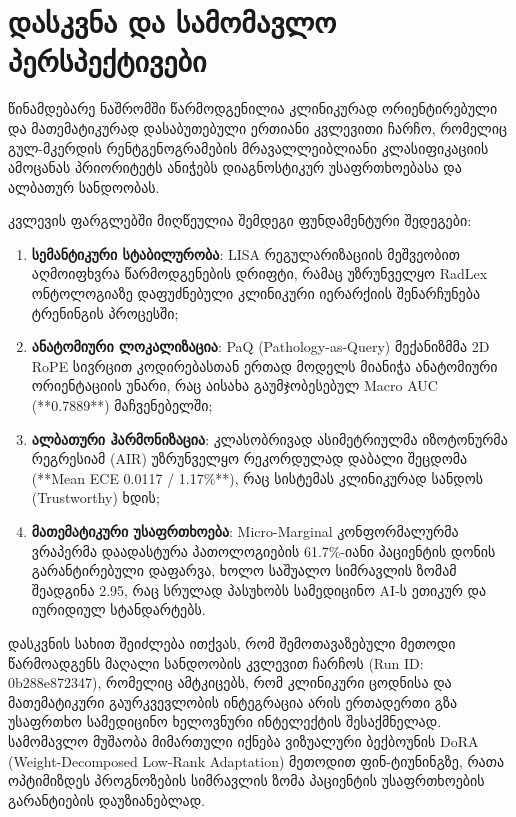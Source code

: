 \documentclass[12pt,a4paper,oneside]{report}
\begin{document}
\chapter{დასკვნა და სამომავლო პერსპექტივები}
წინამდებარე ნაშრომში წარმოდგენილია კლინიკურად ორიენტირებული და მათემატიკურად დასაბუთებული ერთიანი კვლევითი ჩარჩო, რომელიც გულ-მკერდის რენტგენოგრამების მრავალლეიბლიანი კლასიფიკაციის ამოცანას პრიორიტეტს ანიჭებს დიაგნოსტიკურ უსაფრთხოებასა და ალბათურ სანდოობას.

კვლევის ფარგლებში მიღწეულია შემდეგი ფუნდამენტური შედეგები:
\begin{enumerate}[leftmargin=1.6em]
    \item \textbf{სემანტიკური სტაბილურობა}: LISA რეგულარიზაციის მეშვეობით აღმოიფხვრა წარმოდგენების დრიფტი, რამაც უზრუნველყო RadLex ონტოლოგიაზე დაფუძნებული კლინიკური იერარქიის შენარჩუნება ტრენინგის პროცესში;
    \item \textbf{ანატომიური ლოკალიზაცია}: PaQ (Pathology-as-Query) მექანიზმმა 2D RoPE სივრცით კოდირებასთან ერთად მოდელს მიანიჭა ანატომიური ორიენტაციის უნარი, რაც აისახა გაუმჯობესებულ Macro AUC (**0.7889**) მაჩვენებელში;
    \item \textbf{ალბათური ჰარმონიზაცია}: კლასობრივად ასიმეტრიულმა იზოტონურმა რეგრესიამ (AIR) უზრუნველყო რეკორდულად დაბალი შეცდომა (**Mean ECE 0.0117 / 1.17\%**), რაც სისტემას კლინიკურად სანდოს (Trustworthy) ხდის;
    \item \textbf{მათემატიკური უსაფრთხოება}: Micro-Marginal კონფორმალურმა ვრაპერმა დაადასტურა პათოლოგიების 61.7\%-იანი პაციენტის დონის გარანტირებული დაფარვა, ხოლო საშუალო სიმრავლის ზომამ შეადგინა 2.95, რაც სრულად პასუხობს სამედიცინო AI-ს ეთიკურ და იურიდიულ სტანდარტებს.
\end{enumerate}

დასკვნის სახით შეიძლება ითქვას, რომ შემოთავაზებული მეთოდი წარმოადგენს მაღალი სანდოობის კვლევით ჩარჩოს (Run ID: 0b288e872347), რომელიც ამტკიცებს, რომ კლინიკური ცოდნისა და მათემატიკური გაურკვევლობის ინტეგრაცია არის ერთადერთი გზა უსაფრთხო სამედიცინო ხელოვნური ინტელექტის შესაქმნელად. სამომავლო მუშაობა მიმართული იქნება ვიზუალური ბექბოუნის DoRA (Weight-Decomposed Low-Rank Adaptation) მეთოდით ფინ-ტიუნინგზე, რათა ოპტიმიზდეს პროგნოზების სიმრავლის ზომა პაციენტის უსაფრთხოების გარანტიების დაუზიანებლად.

\end{document}
